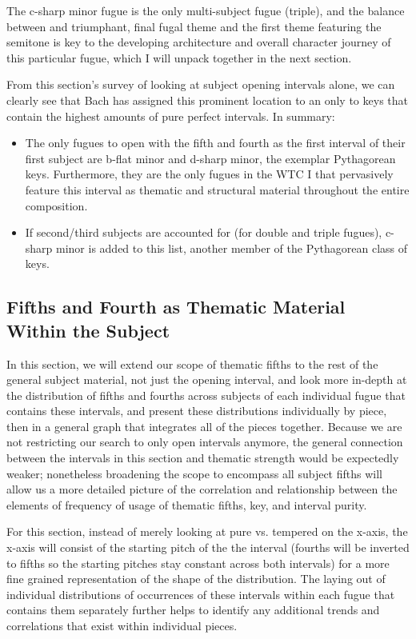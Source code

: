 The c-sharp minor fugue is the only multi-subject fugue (triple), and
the balance between and triumphant, final fugal theme and the first
theme featuring the semitone is key to the developing architecture and
overall character journey of this particular fugue, which I will unpack
together in the next section.

From this section's survey of looking at subject opening intervals
alone, we can clearly see that Bach has assigned this prominent location
to an only to keys that contain the highest amounts of pure perfect
intervals. In summary:

\begin{itemize}
\tightlist
\item
  The only fugues to open with the fifth and fourth as the first
  interval of their first subject are b-flat minor and d-sharp minor,
  the exemplar Pythagorean keys. Furthermore, they are the only fugues
  in the WTC I that pervasively feature this interval as thematic and
  structural material throughout the entire composition.
\item
  If second/third subjects are accounted for (for double and triple
  fugues), c-sharp minor is added to this list, another member of the
  Pythagorean class of keys.
\end{itemize}

    \subsection{Fifths and Fourth as Thematic Material Within the
Subject}\label{fifths-and-fourth-as-thematic-material-within-the-subject}

In this section, we will extend our scope of thematic fifths to the rest
of the general subject material, not just the opening interval, and look
more in-depth at the distribution of fifths and fourths across subjects
of each individual fugue that contains these intervals, and present
these distributions individually by piece, then in a general graph that
integrates all of the pieces together. Because we are not restricting
our search to only open intervals anymore, the general connection
between the intervals in this section and thematic strength would be
expectedly weaker; nonetheless broadening the scope to encompass all
subject fifths will allow us a more detailed picture of the correlation
and relationship between the elements of frequency of usage of thematic
fifths, key, and interval purity.

For this section, instead of merely looking at pure vs. tempered on the
x-axis, the x-axis will consist of the starting pitch of the the
interval (fourths will be inverted to fifths so the starting pitches
stay constant across both intervals) for a more fine grained
representation of the shape of the distribution. The laying out of
individual distributions of occurrences of these intervals within each
fugue that contains them separately further helps to identify any
additional trends and correlations that exist within individual pieces.

